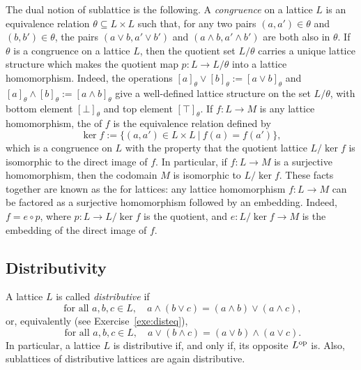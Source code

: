 The dual notion of sublattice is the following. A \emph{congruence} on a lattice $L$ is an equivalence relation $\theta \subseteq L \times L$ such that, for any two pairs $(a,a') \in \theta$ and $(b,b') \in \theta$, the pairs $(a \vee b, a' \vee b')$ and $(a \wedge b, a' \wedge b')$ are both also in $\theta$. If $\theta$ is a congruence on a lattice $L$, then the quotient set $L/{\theta}$ carries a unique lattice structure which makes the quotient map $p \colon L \to L/{\theta}$ into a lattice homomorphism. Indeed, the operations $[a]_{\theta} \vee [b]_{\theta} := [a \vee b]_{\theta}$ and $[a]_{\theta} \wedge [b]_{\theta} := [a \wedge b]_{\theta}$ give a well-defined lattice structure on the set $L/{\theta}$, with bottom element $[\bot]_{\theta}$ and top element $[\top]_{\theta}$. If $f \colon L \to M$ is any lattice homomorphism, the  of $f$ is the equivalence relation defined by
\[\ker f := \{(a,a') \in L \times L \ | \ f(a) = f(a')\},\]
which is a congruence on $L$ with the property that the quotient lattice $L/{\ker f}$ is isomorphic to the direct image of $f$. In particular, if $f \colon L \to M$ is a surjective homomorphism, then the codomain $M$ is isomorphic to $L/{\ker f}$. These facts together are known as the  for lattices: any lattice homomorphism $f \colon L \to M$ can be factored as a surjective homomorphism followed by an embedding. Indeed, $f = e \circ p$, where $p \colon L \to L/{\ker f}$ is the quotient, and $e \colon L/\ker{f} \to M$ is the embedding of the direct image of $f$.

\subsection*{Distributivity}
A lattice $L$ is called \emph{distributive} if
\begin{equation}\label{eq:dist1}
\text{ for all } a, b, c \in L, \quad a \wedge (b \vee c) = (a \wedge b) \vee (a \wedge c),
\end{equation}
or, equivalently (see Exercise~\ref{exe:disteq}),
\begin{equation} \label{eq:dist2}
\text{ for all } a, b, c \in L, \quad a \vee (b \wedge c) = (a \vee b) \wedge (a \vee c).
\end{equation}
In particular, a lattice $L$ is distributive if, and only if, its opposite $L^{\mathrm{op}}$ is. Also, sublattices of distributive lattices are again distributive.


